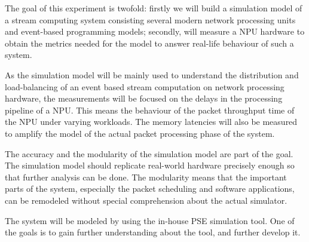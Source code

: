 The goal of this experiment is twofold: firstly we will build a simulation model of a stream computing system consisting several modern network processing units and event-based programming models; secondly, will measure a NPU hardware to obtain the metrics needed for the model to answer real-life behaviour of such a system.

As the simulation model will be mainly used to understand the distribution and load-balancing of an event based stream computation on network processing hardware, the measurements will be focused on the delays in the processing pipeline of a NPU. This means the behaviour of the packet throughput time of the NPU under varying workloads. The memory latencies will also be measured to amplify the model of the actual packet processing phase of the system.

The accuracy and the modularity of the simulation model are part of the goal. The simulation model should replicate real-world hardware precisely enough so that further analysis can be done. The modularity means that the important parts of the system, especially the packet scheduling and software applications, can be remodeled without special comprehension about the actual simulator.

The system will be modeled by using the in-house PSE simulation tool. One of the goals is to gain further understanding about the tool, and further develop it.

